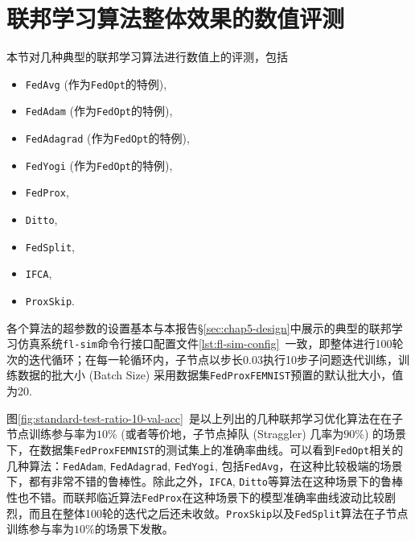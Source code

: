\section{联邦学习算法整体效果的数值评测}
\label{sec:chap6-overall}


本节对几种典型的联邦学习算法进行数值上的评测，包括
\begin{itemize}
    \item \texttt{FedAvg}\cite{mcmahan2017fed_avg} (作为\texttt{FedOpt}\cite{reddi2020fed_opt}的特例),
    \item \texttt{FedAdam}\cite{reddi2020fed_opt, adam} (作为\texttt{FedOpt}\cite{reddi2020fed_opt}的特例),
    \item \texttt{FedAdagrad}\cite{reddi2020fed_opt, adagrad} (作为\texttt{FedOpt}\cite{reddi2020fed_opt}的特例),
    \item \texttt{FedYogi}\cite{reddi2020fed_opt, Zaheer_2018_yogi} (作为\texttt{FedOpt}\cite{reddi2020fed_opt}的特例),
    \item \texttt{FedProx}\cite{sahu2018fedprox},
    \item \texttt{Ditto}\cite{li_2021_ditto},
    \item \texttt{FedSplit}\cite{pathak2020fedsplit},
    \item \texttt{IFCA}\cite{Ghosh_2022_cfl},
    \item \texttt{ProxSkip}\cite{proxskip}.
\end{itemize}
各个算法的超参数的设置基本与本报告\S\ref{sec:chap5-design}中展示的典型的联邦学习仿真系统\texttt{fl-sim}命令行接口配置文件\ref{lst:fl-sim-config}~一致，即整体进行100轮次的迭代循环；在每一轮循环内，子节点以步长0.03执行10步子问题迭代训练，训练数据的批大小 (Batch Size) 采用数据集\texttt{FedProxFEMNIST}预置的默认批大小，值为20.

图\ref{fig:standard-test-ratio-10-val-acc}~是以上列出的几种联邦学习优化算法在在子节点训练参与率为$10\%$ (或者等价地，子节点掉队 (Straggler) 几率为$90\%$) 的场景下，在数据集\texttt{FedProxFEMNIST}的测试集上的准确率曲线。可以看到\texttt{FedOpt}相关的几种算法：\texttt{FedAdam}, \texttt{FedAdagrad}, \texttt{FedYogi}, 包括\texttt{FedAvg}，在这种比较极端的场景下，都有非常不错的鲁棒性。除此之外，\texttt{IFCA}, \texttt{Ditto}等算法在这种场景下的鲁棒性也不错。而联邦临近算法\texttt{FedProx}在这种场景下的模型准确率曲线波动比较剧烈，而且在整体100轮的迭代之后还未收敛。\texttt{ProxSkip}以及\texttt{FedSplit}算法在子节点训练参与率为$10\%$的场景下发散。

